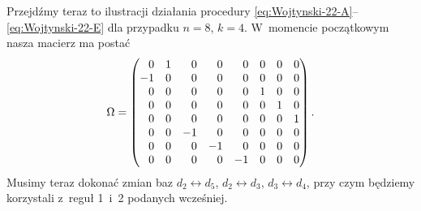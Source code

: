 \documentclass[a4paper,11pt]{article}
\begin{document}
Przejdźmy teraz to ilustracji działania procedury
\eqref{eq:Wojtynski-22-A}--\eqref{eq:Wojtynski-22-E} dla przypadku $n = 8$,
$k = 4$. W~momencie początkowym nasza macierz ma postać
\begin{equation}
  \label{eq:Wojtynski-24}
  \Omega =
  \begin{pmatrix}
    \hphantom{-} 0 & 1 & \hphantom{-} 0 & \hphantom{-} 0
    & \hphantom{-} 0 & 0 & 0 & 0 \\
    -1 & 0 & \hphantom{-} 0 & \hphantom{-} 0 & \hphantom{-} 0
                         & 0 & 0 & 0 \\
    \hphantom{-} 0 & 0 & \hphantom{-} 0 & \hphantom{-} 0
                     & \hphantom{-} 0 & 1 & 0 & 0 \\
    \hphantom{-} 0 & 0 & \hphantom{-} 0 & \hphantom{-} 0
                     & \hphantom{-} 0 & 0 & 1 & 0 \\
    \hphantom{-} 0 & 0 & \hphantom{-} 0 & \hphantom{-} 0
                     & \hphantom{-} 0 & 0 & 0 & 1 \\
    \hphantom{-} 0 & 0 & -1 & \hphantom{-} 0 & \hphantom{-} 0
                         & 0 & 0 & 0 \\
    \hphantom{-} 0 & 0 & \hphantom{-} 0 & -1 & \hphantom{-} 0
                         & 0 & 0 & 0 \\
    \hphantom{-} 0 & 0 & \hphantom{-} 0 & \hphantom{-} 0 & -1
                         & 0 & 0 & 0
  \end{pmatrix}.
\end{equation}
Musimy teraz dokonać zmian baz $d_{ 2 } \leftrightarrow d_{ 5 }$,
$d_{ 2 } \leftrightarrow d_{ 3 }$, $d_{ 3 } \leftrightarrow d_{ 4 }$, przy czym będziemy korzystali
z~reguł 1~i~2 podanych wcześniej.
\end{document}
